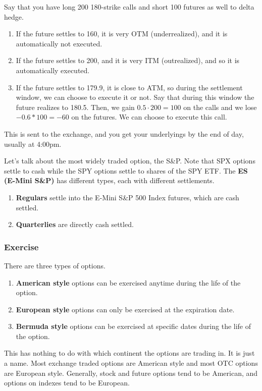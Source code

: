 \documentclass{article}
\begin{document}
      \begin{example}
        Say that you have long 200 180-strike calls and short 100 futures as well to delta hedge. 
        \begin{enumerate}
          \item If the future settles to 160, it is very OTM (underrealized), and it is automatically not executed. 
          \item If the future settles to 200, and it is very ITM (outrealized), and so it is automatically executed. 
          \item If the future settles to 179.9, it is close to ATM, so during the settlement window, we can choose to execute it or not. Say that during this window the future realizes to 180.5. Then, we gain $0.5 \cdot 200 = 100$ on the calls and we lose $-0.6 * 100 = -60$ on the futures. We can choose to execute this call. 
        \end{enumerate}
        This is sent to the exchange, and you get your underlyings by the end of day, usually at 4:00pm. 
      \end{example}

      \begin{example}[ES Options]
        Let's talk about the most widely traded option, the S\&P. Note that SPX options settle to cash while the SPY options settle to shares of the SPY ETF. The \textbf{ES (E-Mini S\&P)} has different types, each with different settlements. 
        \begin{enumerate}
          \item \textbf{Regulars} settle into the E-Mini S\&P 500 Index futures, which are cash settled. 
          \item \textbf{Quarterlies} are directly cash settled.  
        \end{enumerate}
      \end{example}

    \subsubsection{Exercise}

      There are three types of options. 
      \begin{enumerate}
        \item \textbf{American style} options can be exercised anytime during the life of the option. 
        \item \textbf{European style} options can only be exercised at the expiration date.
        \item \textbf{Bermuda style} options can be exercised at specific dates during the life of the option.
      \end{enumerate}
      This has nothing to do with which continent the options are trading in. It is just a name. Most exchange traded options are American style and most OTC options are European style. Generally, stock and future options tend to be American, and options on indexes tend to be European. 
\end{document}
